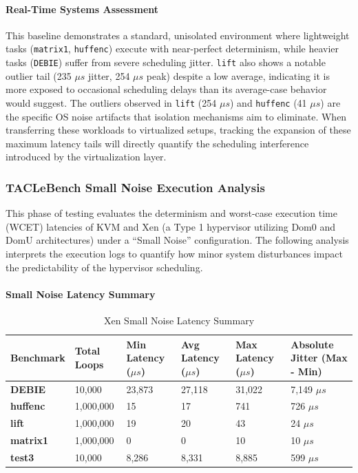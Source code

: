 \paragraph{Real-Time Systems
Assessment}\label{real-time-systems-assessment-4}

This baseline demonstrates a standard, unisolated environment where
lightweight tasks (\texttt{matrix1}, \texttt{huffenc}) execute with
near-perfect determinism, while heavier tasks (\texttt{DEBIE}) suffer
from severe scheduling jitter. \texttt{lift} also shows a notable
outlier tail (235 $\mu s$ jitter, 254 $\mu s$ peak) despite a low average,
indicating it is more exposed to occasional scheduling delays than its
average-case behavior would suggest. The outliers observed in
\texttt{lift} (254 $\mu s$) and \texttt{huffenc} (41 $\mu s$) are the specific OS
noise artifacts that isolation mechanisms aim to eliminate. When
transferring these workloads to virtualized setups, tracking the
expansion of these maximum latency tails will directly quantify the
scheduling interference introduced by the virtualization layer.

\subsubsection{TACLeBench Small Noise Execution
Analysis}\label{taclebench-small-noise-execution-analysis-1}

This phase of testing evaluates the determinism and worst-case execution
time (WCET) latencies of KVM and Xen (a Type 1 hypervisor utilizing Dom0
and DomU architectures) under a ``Small Noise'' configuration. The
following analysis interprets the execution logs to quantify how minor
system disturbances impact the predictability of the hypervisor
scheduling.

\paragraph{Small Noise Latency
Summary}\label{small-noise-latency-summary-1}

\begin{table}
\centering
\caption{Xen Small Noise Latency Summary}
\label{tab:xen:small-noise}
\begin{tabularx}{\linewidth}{@{}YYYYYY@{}}
\toprule
Benchmark & Total Loops & Min Latency ($\mu s$) & Avg Latency ($\mu s$) & Max Latency ($\mu s$) & Absolute Jitter (Max - Min)\tabularnewline
\midrule
\textbf{DEBIE} & 10,000 & 23,873 & 27,118 & 31,022 & 7,149 $\mu s$\tabularnewline
\textbf{huffenc} & 1,000,000 & 15 & 17 & 741 & 726 $\mu s$\tabularnewline
\textbf{lift} & 1,000,000 & 19 & 20 & 43 & 24 $\mu s$\tabularnewline
\textbf{matrix1} & 1,000,000 & 0 & 0 & 10 & 10 $\mu s$\tabularnewline
\textbf{test3} & 10,000 & 8,286 & 8,331 & 8,885 & 599 $\mu s$\tabularnewline
\bottomrule
\end{tabularx}
\end{table}


